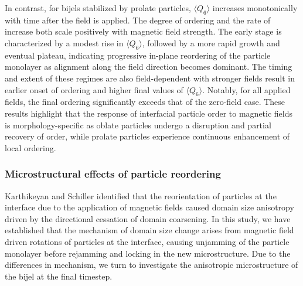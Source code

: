 In contrast, for bijels stabilized by prolate particles, \(\langle Q_6 \rangle\) increases monotonically with time after the field is applied. The degree 
of ordering and the rate of increase both scale positively with magnetic field strength. The early stage is characterized by a modest rise in \(\langle Q_6 \rangle\), 
followed by a more rapid growth and eventual plateau, indicating progressive in-plane reordering of the particle monolayer as alignment along the field direction 
becomes dominant. The timing and extent of these regimes are also field-dependent with stronger fields result in earlier onset of ordering and higher final values 
of \(\langle Q_6 \rangle\). Notably, for all applied fields, the final ordering significantly exceeds that of the zero-field case. These results highlight that the 
response of interfacial particle order to magnetic fields is morphology-specific as oblate particles undergo a disruption and partial recovery of order, 
while prolate particles experience continuous enhancement of local ordering. 

\subsubsection{Microstructural effects of particle reordering}

Karthikeyan and Schiller identified that the reorientation of particles at the interface due to the application of magnetic fields caused domain size anisotropy
driven by the directional cessation of domain coarsening. \cite{karthikeyan_formation_2024} In this study, we have established that the mechanism of domain size change
arises from magnetic field driven rotations of particles at the interface, causing unjamming of the particle monolayer before rejamming and locking in the new
microstructure. Due to the differences in mechanism, we turn to investigate the anisotropic microstructure of the bijel at the final timestep. 

